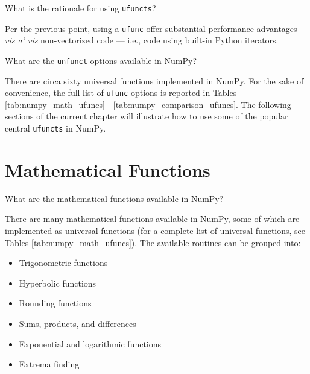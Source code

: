 \documentclass[a4paper,11pt]{book}
\newcommand{\question}[1]{%
    \begin{tcolorbox}[colback=comp_c!10,colframe=comp_c,sidebyside align=top,width=\linewidth,before skip=1ex]
        #1
    \end{tcolorbox}
    \switchcolumn%
}
\newcommand{\note}[1]{%
    \begin{tcolorbox}[colback=white!0,colframe=white!10,width=\linewidth,before skip=1ex]
        #1
    \end{tcolorbox}
}
\begin{document}
\begin{paracol}{2}
	\question{\raggedright What is the rationale for using \texttt{ufuncts}?}
	\note{Per the previous point, using a \href{https://numpy.org/doc/stable/reference/ufuncs.html}{\texttt{ufunc}} offer substantial performance advantages \textit{vis a' vis} non-vectorized code --- i.e., code using built-in Python iterators.}
\end{paracol}

\begin{paracol}{2}
	\question{\raggedright What are the \texttt{unfunct} options available in NumPy?}
	\note{There are circa sixty universal functions implemented in NumPy. For the sake of convenience, the full list of \href{https://numpy.org/doc/stable/reference/ufuncs.html}{\texttt{ufunc}} options is reported in Tables \ref{tab:numpy_math_ufuncs} - \ref{tab:numpy_comparison_ufuncs}. The following sections of the current chapter will illustrate how to use some of the popular central \texttt{ufuncts} in NumPy.}
\end{paracol}

\section{Mathematical Functions}

\begin{paracol}{2}
\question{\raggedright What are the mathematical functions available in NumPy?}
\note{There are many \href{https://numpy.org/doc/stable/reference/routines.math.html}{mathematical functions available in NumPy}, some of which are implemented as universal functions (for a complete list of universal functions, see Tables \ref{tab:numpy_math_ufuncs}). The available routines can be grouped into:
\begin{itemize}
\item Trigonometric functions 
\item Hyperbolic functions 
\item Rounding functions 
\item Sums, products, and differences 
\item Exponential and logarithmic functions
\item Extrema finding  
\end{itemize}}
\end{paracol}
\clearpage
\end{document}
